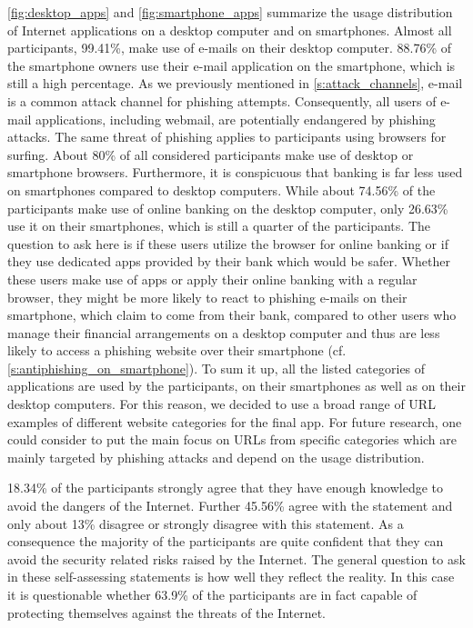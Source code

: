 \begin{description}[leftmargin=0cm]
	\item[Usage Distribution of Internet Applications:] \autoref{fig:desktop_apps} and \autoref{fig:smartphone_apps} summarize the usage distribution of Internet applications on a desktop computer and on smartphones.
 Almost all participants, 99.41\%, make use of e-mails on their desktop computer.
 88.76\% of the smartphone owners use their e-mail application on the smartphone, which is still a high percentage.
 As we previously mentioned in \autoref{s:attack_channels}, e-mail is a common attack channel for phishing attempts.
 Consequently, all users of e-mail applications, including webmail, are potentially endangered by phishing attacks.
 The same threat of phishing applies to participants using browsers for surfing.
 About 80\% of all considered participants make use of desktop or smartphone browsers.
 Furthermore, it is conspicuous that banking is far less used on smartphones compared to desktop computers.
 While about 74.56\% of the participants make use of online banking on the desktop computer, only 26.63\% use it on their smartphones, which is still a quarter of the participants.
	The question to ask here is if these users utilize the browser for online banking or if they use dedicated apps provided by their bank which would be safer.
 Whether these users make use of apps or apply their online banking with a regular browser, they might be more likely to react to phishing e-mails on their smartphone, which claim to come from their bank, compared to other users who manage their financial arrangements on a desktop computer and thus are less likely to access a phishing website over their smartphone (cf. \autoref{s:antiphishing_on_smartphone}). To sum it up, all the listed categories of applications are used by the participants, on their smartphones as well as on their desktop computers.
 For this reason, we decided to use a broad range of URL examples of different website categories for the final app.
 For future research, one could consider to put the main focus on URLs from specific categories which are mainly targeted by phishing attacks and depend on the usage distribution.

	\item[Self-Assessment - Knowledge to avoid dangers of Internet:] 18.34\% of the participants strongly agree that they have enough knowledge to avoid the dangers of the Internet. Further 45.56\% agree with the statement and only about 13\% disagree or strongly disagree with this statement.
 As a consequence the majority of the participants are quite confident that they can avoid the security related risks raised by the Internet.
The general question to ask in these self-assessing statements is how well they reflect the reality.
In this case it is questionable whether 63.9\% of the participants are in fact capable of protecting themselves against the threats of the Internet.
	

\end{description}
